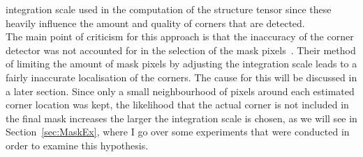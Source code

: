 integration scale used in the computation of the structure tensor since these heavily influence the
amount and quality of corners that are detected. \\
The main point of criticism for this approach is that the inaccuracy of the corner 
detector was not accounted for in the selection of the mask
pixels~\cite{conversation}. Their method of limiting the amount of mask pixels by adjusting the integration scale leads
to a fairly inaccurate localisation of the corners. The cause for this will be discussed in
a later section.
Since only a small neighbourhood of pixels around each estimated corner
location was kept, the likelihood that the actual corner is not included in the final mask
increases the larger the integration scale is chosen, as we will see in Section~\ref{sec:MaskEx},
where I go over some experiments that were conducted in order to examine this hypothesis.\\

